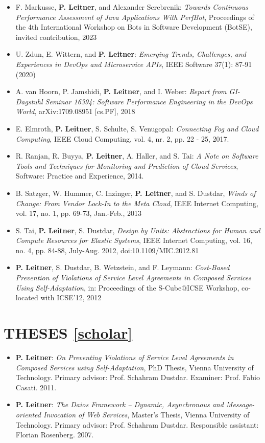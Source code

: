 \documentclass[paper=letter,fontsize=11pt]{scrartcl} %
\newcommand{\NewPart}[2]{\section*{\uppercase{#1} #2}}
\begin{document}
\begin{itemize}
  \item  F. Markusse, \textbf{P. Leitner}, and  Alexander Serebrenik: \emph{Towards Continuous Performance Assessment of Java Applications With PerfBot}, Proceedings of the 4th International Workshop on Bots in Software Development (BotSE), invited contribution, 2023
	\item  U. Zdun, E. Wittern, and \textbf{P. Leitner}: \emph{Emerging Trends, Challenges, and Experiences in DevOps and Microservice APIs}, IEEE Software 37(1): 87-91 (2020)
	\item A. van Hoorn, P. Jamshidi, \textbf{P. Leitner}, and I. Weber:
	\emph{Report from GI-Dagstuhl Seminar 16394: Software Performance Engineering in the DevOps World}, arXiv:1709.08951 [cs.PF], 2018
	\item E. Elmroth, \textbf{P. Leitner}, S. Schulte, S. Venugopal:
  \emph{Connecting Fog and Cloud Computing}, IEEE Cloud Computing, vol. 4, nr. 2, pp. 22 - 25, 2017.
  \item R. Ranjan, R. Buyya, \textbf{P. Leitner}, A. Haller, and S. Tai:
  \emph{A Note on Software Tools and Techniques for Monitoring and Prediction of Cloud Services}, Software: Practice and Experience, 2014.
  \item B. Satzger, W. Hummer, C. Inzinger, \textbf{P. Leitner}, and S. Dustdar, \emph{Winds of Change: From Vendor Lock-In to the Meta Cloud}, IEEE Internet Computing, vol. 17, no. 1, pp. 69-73, Jan.-Feb., 2013
  \item S. Tai, \textbf{P. Leitner}, S. Dustdar, \emph{Design by Units: Abstractions for Human and Compute Resources for Elastic Systems}, IEEE Internet Computing, vol. 16, no. 4, pp. 84-88, July-Aug. 2012, doi:10.1109/MIC.2012.81
  \item \textbf{P. Leitner}, S. Dustdar, B. Wetzstein, and F.
  Leymann: \emph{Cost-Based Prevention of Violations of Service Level Agreements
  in Composed Services Using Self-Adaptation}, in: Proceedings of the S-Cube@ICSE Workshop, co-located with ICSE'12, 2012
\end{itemize}

\NewPart{Theses}{\href{https://scholar.google.ch/citations?user=wZ9f8CAAAAAJ}{[scholar]}}

\begin{itemize}
  \item \textbf{P. Leitner}: \emph{On Preventing Violations of Service Level
  Agreements in Composed Services using Self-Adaptation},  PhD Thesis, Vienna
  University of Technology. Primary advisor: Prof. Schahram Dustdar. Examiner:
  Prof. Fabio Casati. 2011.
  \item \textbf{P. Leitner}: \emph{The Daios Framework -- Dynamic, Asynchronous
  and Message-oriented Invocation of Web Services},  Master's Thesis, Vienna
  University of Technology. Primary advisor: Prof. Schahram Dustdar. Responsible
  assistant: Florian Rosenberg. 2007.
\end{itemize}
\end{document}
